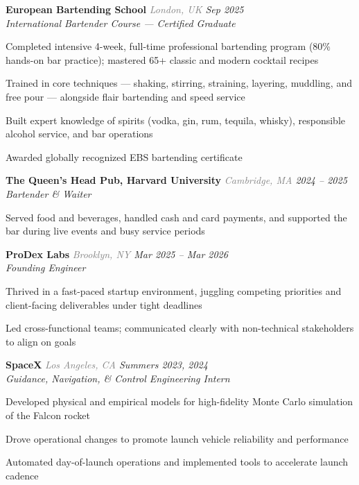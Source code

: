 \documentclass[11pt,letterpaper]{article}
\begin{document}
\textbf{European Bartending School} {\small\textit{\textcolor{gray}{London, UK} \hfill \textcolor{niceblue}{Sep 2025}}}\\
\textit{International Bartender Course --- Certified Graduate}
\begin{bulletdescription}
    \item Completed intensive 4-week, full-time professional bartending program (80\% hands-on bar practice); mastered 65+ classic and modern cocktail recipes
    \item Trained in core techniques --- shaking, stirring, straining, layering, muddling, and free pour --- alongside flair bartending and speed service
    \item Built expert knowledge of spirits (vodka, gin, rum, tequila, whisky), responsible alcohol service, and bar operations
    \item Awarded globally recognized EBS bartending certificate
\end{bulletdescription}

\vspace{6pt}

\textbf{The Queen's Head Pub, Harvard University} {\small\textit{\textcolor{gray}{Cambridge, MA} \hfill \textcolor{niceblue}{2024 -- 2025}}}\\
\textit{Bartender \& Waiter}
\begin{bulletdescription}
    \item Served food and beverages, handled cash and card payments, and supported the bar during live events and busy service periods
\end{bulletdescription}

\vspace{6pt}

\textbf{ProDex Labs} {\small\textit{\textcolor{gray}{Brooklyn, NY} \hfill \textcolor{niceblue}{Mar 2025 -- Mar 2026}}}\\
\textit{Founding Engineer}
\begin{bulletdescription}
    \item Thrived in a fast-paced startup environment, juggling competing priorities and client-facing deliverables under tight deadlines
    \item Led cross-functional teams; communicated clearly with non-technical stakeholders to align on goals
\end{bulletdescription}

\vspace{6pt}

\textbf{SpaceX} {\small\textit{\textcolor{gray}{Los Angeles, CA} \hfill \textcolor{niceblue}{Summers 2023, 2024}}}\\
\textit{Guidance, Navigation, \& Control Engineering Intern}
\begin{bulletdescription}
    \item Developed physical and empirical models for high-fidelity Monte Carlo simulation of the Falcon rocket
    \item Drove operational changes to promote launch vehicle reliability and performance
    \item Automated day-of-launch operations and implemented tools to accelerate launch cadence
\end{bulletdescription}
\end{document}
